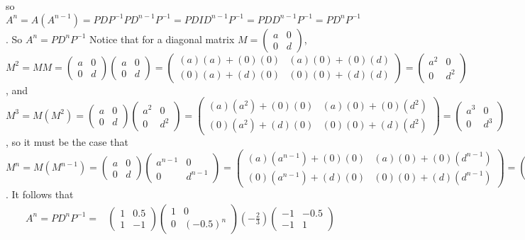 \documentclass[12pt]{article}
\newenvironment{solution}[1][Solution]
{
	\begin{trivlist} 
		\item[\hskip \labelsep {\itshape #1:}]
	}
	{
	\end{trivlist}
}
\begin{document}
\begin{solution}
so $A^{n}=A(A^{n-1})=P D P^{-1}P D^{n-1} P^{-1} =P D I D^{n-1} P^{-1}=P D D^{n-1} P^{-1} =P D^{n} P^{-1}$. So $A^{n}=P D^{n} P^{-1}$ Notice that for a diagonal matrix $M=\begin{pmatrix}a&0\\0&d\end{pmatrix}$, $M^2 = MM=\begin{pmatrix}a&0\\0&d\end{pmatrix}\begin{pmatrix}a&0\\0&d\end{pmatrix} = \begin{pmatrix}(a)(a)+(0)(0)&(a)(0)+(0)(d)\\(0)(a)+(d)(0)&(0)(0)+(d)(d)\end{pmatrix}=\begin{pmatrix}a^2&0\\0&d^2\end{pmatrix}$, and $M^3 = M(M^2)=\begin{pmatrix}a&0\\0&d\end{pmatrix}\begin{pmatrix}a^2 &0\\0&d^2 \end{pmatrix} = \begin{pmatrix}(a)(a^2)+(0)(0)&(a)(0)+(0)(d^2)\\(0)(a^2)+(d)(0)&(0)(0)+(d)(d^2)\end{pmatrix}=\begin{pmatrix}a^3&0\\0&d^3\end{pmatrix}$, so it must be the case that $M^{n}=M(M^{n-1})=\begin{pmatrix}a&0\\0&d\end{pmatrix}\begin{pmatrix}a^{n-1}&0\\0&d^{n-1}\end{pmatrix} = \begin{pmatrix}(a)(a^{n-1})+(0)(0)&(a)(0)+(0)(d^{n-1})\\(0)(a^{n-1})+(d)(0)&(0)(0)+(d)(d^{n-1})\end{pmatrix}=\begin{pmatrix}a^{n}&0\\0&d^{n}\end{pmatrix}$. It follows that 
\begin{align*}
A^{n}=P D^{n} P^{-1} =& \begin{pmatrix}1&0.5\\1&-1\end{pmatrix} \begin{pmatrix}1&0\\0&(-0.5)^{n}\end{pmatrix} \left( -\frac{2}{3} \right) \begin{pmatrix}-1&-0.5\\-1&1\end{pmatrix} &\\

\end{align*}
\end{solution}
\end{document}
